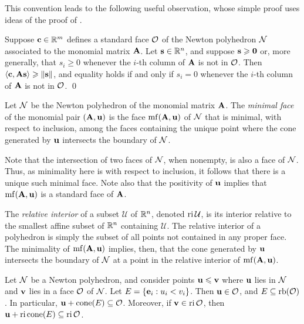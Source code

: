 \documentclass{amsart}
\begin{document}
This convention leads to the following useful observation, whose simple proof uses ideas of the proof of .

\begin{proposition}
   \label{prop: inner product with columns of A}
   Suppose $\mathbf{c} \in \mathbb{R}^m$ defines a standard face $\mathcal{O}$ of the Newton polyhedron $\mathcal{N}$ associated to the monomial matrix $\mathbf{A}$.
   Let $\mathbf{s} \in \mathbb{R}^n$, and suppose $\mathbf{s} \geqslant \mathbf{0}$ or, more generally, that $s_i \ge 0$ whenever the $i$-th column of $\mathbf{A}$ is not in $\mathcal{O}$.
   Then $\langle \mathbf{c}, \mathbf{A}\mathbf{s} \rangle \geqslant \| \mathbf{s} \|$, and equality holds if and only if $s_i = 0$ whenever the $i$-th column of $\mathbf{A}$ is not in $\mathcal{O}$.
   \qed
\end{proposition}

\begin{definition}
   Let $\mathcal{N}$ be the Newton polyhedron of the monomial matrix $\mathbf{A}$.
   The \emph{minimal face} of the monomial pair $(\mathbf{A}, \mathbf{u})$ is the face $\operatorname{mf}(\mathbf{A}, \mathbf{u})$ of $\mathcal{N}$ that is minimal, with respect to inclusion, among the faces containing the unique point where the cone generated by $\mathbf{u}$ intersects the boundary of $\mathcal{N}$.
\end{definition}

Note that the intersection of two faces of $\mathcal{N}$, when nonempty, is also a face of $\mathcal{N}$.
Thus, as minimality here is with respect to inclusion, it follows that there is a unique such minimal face.
Note also that the positivity of $\mathbf{u}$ implies that $\operatorname{mf}(\mathbf{A},\mathbf{u})$ is a standard face of $\mathbf{A}$.

The \emph{relative interior} of a subset $\mathcal{U}$ of $\mathbb{R}^n$, denoted $\operatorname{ri} \mathcal{U}$, is its interior relative to the smallest affine subset of $\mathbb{R}^n$ containing $\mathcal{U}$.
The relative interior of a polyhedron is simply the subset of all points not contained in any proper face.
The minimality of $\operatorname{mf}(\mathbf{A},\mathbf{u})$ implies, then, that the cone generated by $\mathbf{u}$ intersects the boundary of $\mathcal{N}$ at a point in the relative interior of $\operatorname{mf}(\mathbf{A},\mathbf{u})$.

\begin{proposition}
   \label{prop: a property of the boundary}
   Let $\mathcal{N}$ be a Newton polyhedron, and consider points $\mathbf{u} \leqslant \mathbf{v}$ where $\mathbf{u}$ lies in  $\mathcal{N}$ and $\mathbf{v}$ lies in a face $\mathcal{O}$ of $\mathcal{N}$.
   Let $E = \{\mathbf{e}_i : u_i < v_i\}$.
   Then $\mathbf{u}\in\mathcal{O}$, and $E \subseteq \operatorname{rb}(\mathcal{O})$.
   In particular, $\mathbf{u} + \operatorname{cone}(E) \subseteq \mathcal{O}$.
   Moreover, if $\mathbf{v}\in \operatorname{ri}\mathcal{O}$, then $\mathbf{u} + \operatorname{ri} \operatorname{cone}(E) \subseteq \operatorname{ri}\mathcal{O}$.
\end{proposition}
\end{document}
